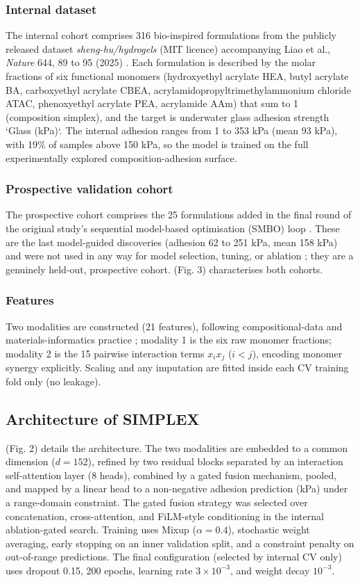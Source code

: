 \documentclass[utf8]{FrontiersinHarvard}
\begin{document}
\subsubsection{Internal dataset}
The internal cohort comprises 316 bio-inspired formulations from the publicly released dataset \emph{sheng-hu/hydrogels} (MIT licence) accompanying Liao et al., \textit{Nature} 644, 89 to 95 (2025) \cite{liao2025nature}. Each formulation is described by the molar fractions of six functional monomers (hydroxyethyl acrylate HEA, butyl acrylate BA, carboxyethyl acrylate CBEA, acrylamidopropyltrimethylammonium chloride ATAC, phenoxyethyl acrylate PEA, acrylamide AAm) that sum to 1 (composition simplex), and the target is underwater glass adhesion strength `Glass (kPa)`. The internal adhesion ranges from 1 to 353 kPa (mean 93 kPa), with 19\% of samples above 150 kPa, so the model is trained on the full experimentally explored composition-adhesion surface.

\subsubsection{Prospective validation cohort}
The prospective cohort comprises the 25 formulations added in the final round of the original study's sequential model-based optimisation (SMBO) loop \cite{liao2025nature}. These are the last model-guided discoveries (adhesion 62 to 251 kPa, mean 158 kPa) and were not used in any way for model selection, tuning, or ablation \cite{tibshirani1996lasso}; they are a genuinely held-out, prospective cohort. (Fig. 3) characterises both cohorts.

\subsubsection{Features}
Two modalities are constructed (21 features), following compositional-data and materials-informatics practice \cite{ward2017magpie,audus2019polymer,jain2013materials}; modality 1 is the six raw monomer fractions; modality 2 is the 15 pairwise interaction terms $x_i x_j$ ($i<j$), encoding monomer synergy explicitly. Scaling and any imputation are fitted inside each CV training fold only (no leakage).

\subsection{Architecture of SIMPLEX}

(Fig. 2) details the architecture. The two modalities are embedded to a common dimension ($d=152$), refined by two residual blocks separated by an interaction self-attention layer (8 heads), combined by a gated fusion mechanism, pooled, and mapped by a linear head to a non-negative adhesion prediction (kPa) under a range-domain constraint. The gated fusion strategy was selected over concatenation, cross-attention, and FiLM-style conditioning in the internal ablation-gated search. Training uses Mixup ($\alpha=0.4$), stochastic weight averaging, early stopping on an inner validation split, and a constraint penalty on out-of-range predictions. The final configuration (selected by internal CV only) uses dropout 0.15, 200 epochs, learning rate $3\times10^{-3}$, and weight decay $10^{-3}$.
\end{document}
